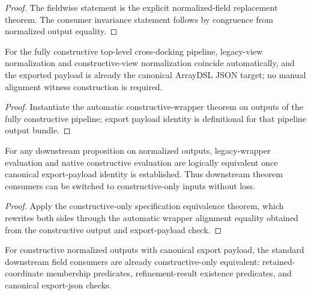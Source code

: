 \begin{proof}
The fieldwise statement is the explicit normalized-field replacement theorem. The consumer invariance statement follows by congruence from normalized output equality.
\end{proof}

\begin{theorem}\label{thm:fully-constructive-pipeline-deprecation-ready}
For the fully constructive top-level cross-docking pipeline, legacy-view normalization and constructive-view normalization coincide automatically, and the exported payload is already the canonical ArrayDSL JSON target; no manual alignment witness construction is required.
\end{theorem}

\begin{proof}
Instantiate the automatic constructive-wrapper theorem on outputs of the fully constructive pipeline; export payload identity is definitional for that pipeline output bundle.
\end{proof}

\begin{theorem}\label{thm:constructive-only-spec-replacement}
For any downstream proposition on normalized outputs, legacy-wrapper evaluation and native constructive evaluation are logically equivalent once canonical export-payload identity is established. Thus downstream theorem consumers can be switched to constructive-only inputs without loss.
\end{theorem}

\begin{proof}
Apply the constructive-only specification equivalence theorem, which rewrites both sides through the automatic wrapper alignment equality obtained from the constructive output and export-payload check.
\end{proof}

\begin{theorem}\label{thm:constructive-only-core-field-consumers}
For constructive normalized outputs with canonical export payload, the standard downstream field consumers are already constructive-only equivalent: retained-coordinate membership predicates, refinement-result existence predicates, and canonical export-json checks.
\end{theorem}

